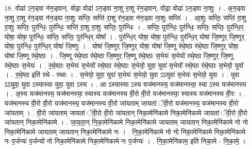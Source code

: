 \documentclass[17pt]{extarticle}
\begin{document}
18. वोढा॑ ऽन॒ड्वा न॑न॒ड्वान्. वोढा॒ वोढा॑ ऽन॒ड्वा ना॒शु रा॒शु र॑न॒ड्वान्. वोढा॒ वोढा॑ ऽन॒ड्वा ना॒शुः । . अ॒न॒ड्वा ना॒शु रा॒शु र॑न॒ड्वा न॑न॒ड्वा ना॒शुः सप्तिः॒ सप्ति॑ रा॒शु र॑न॒ड्वा न॑न॒ड्वा ना॒शुः सप्तिः॑ । . आ॒शुः सप्तिः॒ सप्ति॑ रा॒शु रा॒शुः सप्तिः॒ पुर॑न्धिः॒ पुर॑न्धिः॒ सप्ति॑ रा॒शु रा॒शुः सप्तिः॒ पुर॑न्धिः । . सप्तिः॒ पुर॑न्धिः॒ पुर॑न्धिः॒ सप्तिः॒ सप्तिः॒ पुर॑न्धि॒र् योषा॒ योषा॒ पुर॑न्धिः॒ सप्तिः॒ सप्तिः॒ पुर॑न्धि॒र् योषा᳚ । . पुर॑न्धि॒र् योषा॒ योषा॒ पुर॑न्धिः॒ पुर॑न्धि॒र् योषा॑ जि॒ष्णुर् जि॒ष्णुर् योषा॒ पुर॑न्धिः॒ पुर॑न्धि॒र् योषा॑ जि॒ष्णुः । . योषा॑ जि॒ष्णुर् जि॒ष्णुर् योषा॒ योषा॑ जि॒ष्णू र॑थे॒ष्ठा र॑थे॒ष्ठा जि॒ष्णुर् योषा॒ योषा॑ जि॒ष्णू र॑थे॒ष्ठाः । . जि॒ष्णू र॑थे॒ष्ठा र॑थे॒ष्ठा जि॒ष्णुर् जि॒ष्णू र॑थे॒ष्ठाः स॒भेयः॑ स॒भेयो॑ रथे॒ष्ठा जि॒ष्णुर् जि॒ष्णू र॑थे॒ष्ठाः स॒भेयः॑ । . र॒थे॒ष्ठाः स॒भेयः॑ स॒भेयो॑ रथे॒ष्ठा र॑थे॒ष्ठाः स॒भेयो॒ युवा॒ युवा॑ स॒भेयो॑ रथे॒ष्ठा र॑थे॒ष्ठाः स॒भेयो॒ युवा᳚ । . र॒थे॒ष्ठा इति॑ रथे - स्थाः । . स॒भेयो॒ युवा॒ युवा॑ स॒भेयः॑ स॒भेयो॒ युवा ऽऽयुवा॑ स॒भेयः॑ स॒भेयो॒ युवा । . युवा ऽऽयुवा॒ युवा ऽस्यास्या युवा॒ युवा ऽस्य । . आ ऽस्यास्या ऽस्य यज॑मानस्य॒ यज॑मानस्या॒ स्या ऽस्य यज॑मानस्य । . अ॒स्य यज॑मानस्य॒ यज॑मानस्या॒ स्यास्य यज॑मानस्य वी॒रो वी॒रो यज॑मानस्या॒ स्यास्य यज॑मानस्य वी॒रः । . यज॑मानस्य वी॒रो वी॒रो यज॑मानस्य॒ यज॑मानस्य वी॒रो जा॑यताम् जायतां ॅवी॒रो यज॑मानस्य॒ यज॑मानस्य वी॒रो जा॑यताम् । . वी॒रो जा॑यताम् जायतां ॅवी॒रो वी॒रो जा॑यतान् निका॒मेनि॑कामे निका॒मेनि॑कामे जायतां ॅवी॒रो वी॒रो जा॑यतान् निका॒मेनि॑कामे । . जा॒य॒ता॒न् नि॒का॒मेनि॑कामे निका॒मेनि॑कामे जायताम् जायतान् निका॒मेनि॑कामे नो नो निका॒मेनि॑कामे जायताम् जायतान् निका॒मेनि॑कामे नः । . नि॒का॒मेनि॑कामे नो नो निका॒मेनि॑कामे निका॒मेनि॑कामे नः प॒र्जन्यः॑ प॒र्जन्यो॑ नो निका॒मेनि॑कामे निका॒मेनि॑कामे नः प॒र्जन्यः॑ । . नि॒का॒मेनि॑काम॒ इति॑ निका॒मे - नि॒का॒मे॒ । \newline
\end{document}

